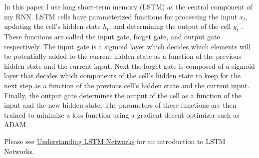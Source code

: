 \documentclass[12pt]{article}
\begin{document}
In this paper I use long short-term memory (LSTM) as the central component of my RNN. LSTM cells have parameterized functions for processing the input $x_t$, updating the cell's hidden state $h_t$, and determining the output of the cell $y_t$ \citep{1997_LSTM}. These functions are called the input gate, forget gate, and output gate respectively. The input gate is a sigmoid layer which decides which elements will be potentially added to the current hidden state as a function of the previous hidden state and the current input. Next the forget gate is composed of a sigmoid layer that decides which components of the cell's hidden state to keep for the next step as a function of the previous cell's hidden state and the current input. Finally, the output gate determines the output of the cell as a function of the input and the new hidden state. The parameters of these functions are then trained to minimize a loss function using a gradient decent optimizer such as ADAM.

Please see \href{http://colah.github.io/posts/2015-08-Understanding-LSTMs/}{Understanding LSTM Networks} for an introduction to LSTM Networks.



\end{document}
